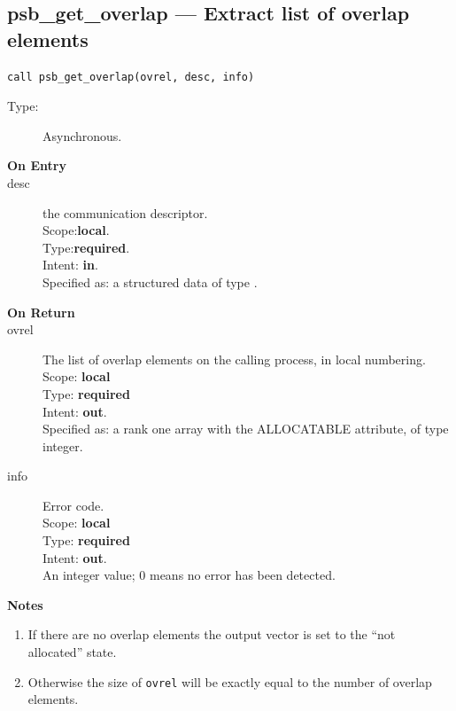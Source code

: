 \clearpage\subsection{psb\_get\_overlap --- Extract list of overlap
  elements}

\begin{verbatim}
call psb_get_overlap(ovrel, desc, info)
\end{verbatim}

\begin{description}
\item[Type:] Asynchronous.
\item[\bf On Entry]
\item[desc] the communication descriptor.\\
Scope:{\bf local}.\\
Type:{\bf required}.\\
Intent: {\bf in}.\\
Specified as: a structured data of type \descdata.
\end{description}

\begin{description}
\item[\bf On Return]
\item[ovrel] The list of overlap elements on the calling process, in
  local numbering.\\
Scope: {\bf local} \\
Type: {\bf required}\\
Intent: {\bf out}.\\
Specified as: a rank one array with the ALLOCATABLE
attribute, of type integer.\\
\item[info] Error code.\\
Scope: {\bf local} \\
Type: {\bf required} \\
Intent: {\bf out}.\\
An integer value; 0 means no error has been detected. 
\end{description}

{\par\noindent\large\bfseries Notes}
\begin{enumerate}
\item If there are no overlap elements the output vector is set
  to the ``not allocated'' state.  
\item Otherwise the size of \verb|ovrel| will be exactly equal to the
  number of overlap elements. 
\end{enumerate}



